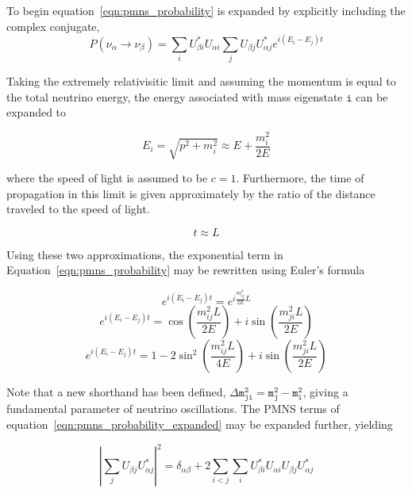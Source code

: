 To begin equation~\ref{eqn:pmns_probability} is expanded by explicitly including the complex conjugate,  
\begin{equation}
P\left(\nu_\alpha\rightarrow\nu_\beta\right) =  \sum_i U^*_{\beta i} U_{\alpha i} \sum_j U_{\beta j} U^*_{\alpha j} e^{i \left(E_i-E_j\right) t} 
\label{eqn:pmns_probability_expanded}
\end{equation}

Taking the extremely relativisitic limit and assuming the momentum is equal to the total neutrino energy, the energy associated with mass eigenstate $\mathtt{i}$ can be expanded to

\begin{equation}
E_i = \sqrt{p^2 + m_i^2} \approx E +\frac{m_i^2}{2E} 
\end{equation}

where the speed of light is assumed to be $c=1$.
Furthermore, the time of propagation in this limit is given approximately by the ratio of the distance traveled to the speed of light.

\begin{equation}
t \approx L
\end{equation}

Using these two approximations, the exponential term in Equation~\ref{eqn:pmns_probability} may be rewritten using Euler's formula

\begin{equation}
 e^{i \left(E_i-E_j\right) t} = e^{i \frac{m_{ij}^2}{2E} L}
\end{equation}
\begin{equation}
 e^{i \left(E_i-E_j\right) t} = \cos\left(\frac{m_{ij}^2 L}{2E}\right) + i \sin\left(\frac{m_{ji}^2 L}{2E}\right)
\end{equation}
\begin{equation}
 e^{i \left(E_i-E_j\right) t} = 1 - 2\sin^2\left(\frac{m_{ij}^2 L}{4E}\right) + i \sin\left(\frac{m_{ji}^2 L}{2E}\right)
\end{equation}

Note that a new shorthand has been defined, $\mathtt{\Delta m^2_{ji} = m^2_j - m^2_i}$, giving a fundamental parameter of neutrino oscillations.
The PMNS terms of equation~\ref{eqn:pmns_probability_expanded} may be expanded further, yielding 

\begin{equation}
\left| \sum_j U_{\beta j} U^*_{\alpha j}\right|^2 = \delta_{\alpha \beta} + 2 \sum_{i<j} \sum_i U^*_{\beta i} U_{\alpha i}  U_{\beta j} U^*_{\alpha j}
\end{equation}

